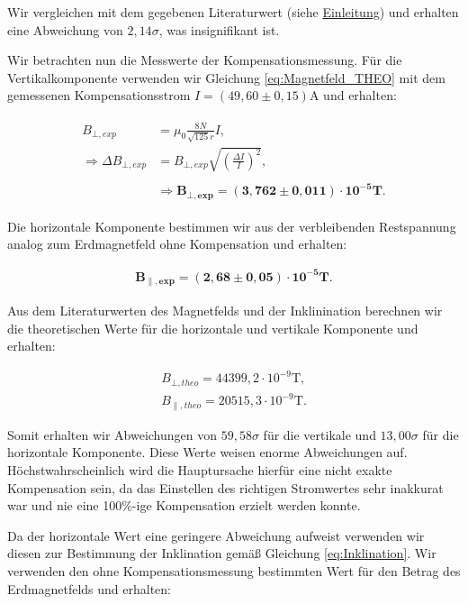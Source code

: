 \documentclass{article}
\begin{document}
Wir vergleichen mit dem gegebenen Literaturwert (siehe \hyperref[eq:Erdmagnetfeld-Theo]{Einleitung}) und erhalten eine Abweichung von $2,14\sigma$, was insignifikant ist.

Wir betrachten nun die Messwerte der Kompensationsmessung. Für die Vertikalkomponente verwenden wir Gleichung \ref{eq:Magnetfeld_THEO} mit dem gemessenen Kompensationsstrom $I = (49,60 \pm 0,15)$A und erhalten:

\begin{eqnarray}
    \begin{split}
        B_{\bot,exp} &= \mu_0 \frac{8N}{\sqrt{125} r} I, \\
        \Rightarrow \Delta B_{\bot,exp} &= B_{\bot,exp} \sqrt{\left( \frac{\Delta I}{I} \right)^2}, \\ \\
        &\Rightarrow \bm{B_{\bot,exp} = (3,762 \pm 0,011)\cdot 10^{-5}} \textbf{T}. 
    \end{split}
\end{eqnarray}

Die horizontale Komponente bestimmen wir aus der verbleibenden Restspannung analog zum Erdmagnetfeld ohne Kompensation und erhalten:

\begin{eqnarray}
    \bm{B_{\parallel,exp} = (2,68 \pm 0,05)\cdot 10^{-5}} \textbf{T}. 
\end{eqnarray}

Aus dem Literaturwerten des Magnetfelds und der Inklinination berechnen wir die theoretischen Werte für die horizontale und vertikale Komponente und erhalten:

\begin{equation}
    \begin{split}
        B_{\bot,theo} = 44399,2 \cdot 10^{-9} \text{T}, \\
        B_{\parallel,theo} = 20515,3 \cdot 10^{-9} \text{T}.
    \end{split}
\end{equation}

Somit erhalten wir Abweichungen von $59,58\sigma$ für die vertikale und $13,00\sigma$ für die horizontale Komponente. Diese Werte weisen enorme Abweichungen auf. Höchstwahrscheinlich wird die Hauptursache hierfür eine nicht exakte Kompensation sein, da das Einstellen des richtigen Stromwertes sehr inakkurat war und nie eine 100\%-ige Kompensation erzielt werden konnte. 

Da der horizontale Wert eine geringere Abweichung aufweist verwenden wir diesen zur Bestimmung der Inklination gemäß Gleichung \ref{eq:Inklination}. Wir verwenden den ohne Kompensationsmessung bestimmten Wert für den Betrag des Erdmagnetfelds und erhalten:
\end{document}
